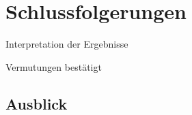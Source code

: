 \chapter{Schlussfolgerungen}\label{ch:conclusion}

\begin{todos}
    \item Interpretation der Ergebnisse
    \item Vermutungen bestätigt
\end{todos}

\section{Ausblick}
